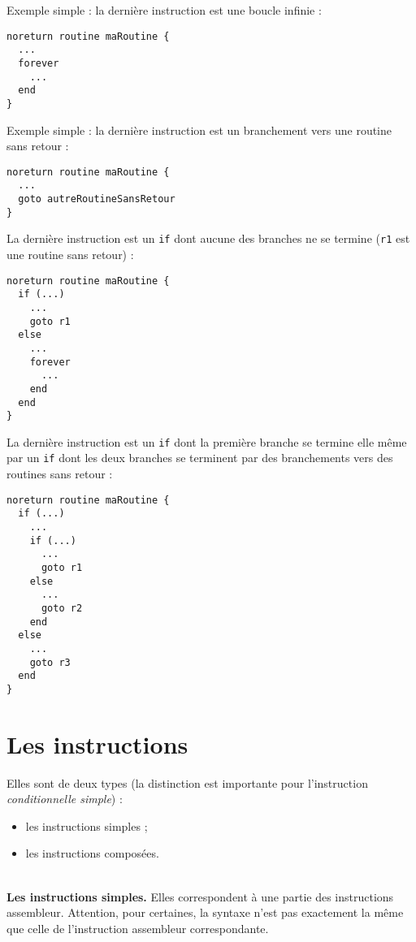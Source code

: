 Exemple simple : la dernière instruction est une boucle infinie :
\begin{lstlisting}[language=piccolo]
noreturn routine maRoutine {
  ...
  forever
    ...
  end
}
\end{lstlisting}

Exemple simple : la dernière instruction est un branchement vers une routine sans retour :
\begin{lstlisting}[language=piccolo]
noreturn routine maRoutine {
  ...
  goto autreRoutineSansRetour
}
\end{lstlisting}


La dernière instruction est un \texttt{if} dont aucune des branches ne se termine (\texttt{r1} est une routine sans retour) :
\begin{lstlisting}[language=piccolo]
noreturn routine maRoutine {
  if (...)
    ...
    goto r1
  else
    ...
    forever
      ...
    end
  end
}

\end{lstlisting}


La dernière instruction est un \texttt{if} dont la première branche se termine elle même par un \texttt{if} dont les deux branches se terminent par des branchements vers des routines sans retour :
\begin{lstlisting}[language=piccolo]
noreturn routine maRoutine {
  if (...)
    ...
    if (...)
      ...
      goto r1
    else
      ...
      goto r2
    end
  else
    ...
    goto r3
  end
}
\end{lstlisting}









\section{Les instructions}

Elles sont de deux types (la distinction est importante pour l’instruction \emph{conditionnelle simple}) :
\begin{itemize}
  \item les instructions simples ;
  \item les instructions composées.

\end{itemize}


~\\
\textbf{Les instructions simples.} Elles correspondent à une partie des instructions assembleur. Attention, pour certaines, la syntaxe n'est pas exactement la même que celle de l'instruction assembleur correspondante.

